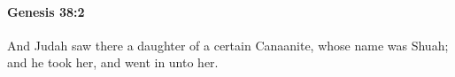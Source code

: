 
		\paragraph{Genesis 38:2} %
			\label{GENESIS-38-2}

			And Judah saw there a daughter of a certain Canaanite, whose name was Shuah; and he took her, and went in unto her.


